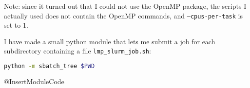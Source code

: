 Note: since it turned out that I could not use the OpenMP package, the scripts I actually used does not contain the OpenMP commands, and {\tt --cpus-per-task} is set to 1.

I have made a small python module that lets me submit a job for each subdirectory containing a file {\tt lmp\_slurm\_job.sh}:

\begin{lstlisting}[language=Bash]
python -m sbatch_tree $PWD
\end{lstlisting}

@InsertModuleCode